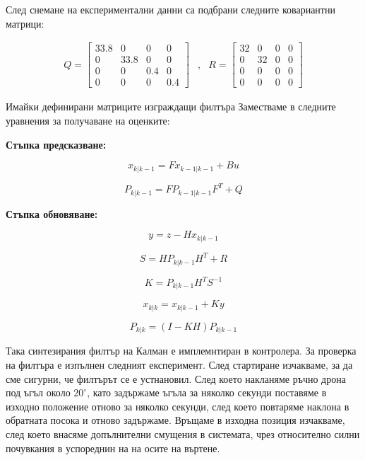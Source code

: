 След снемане на експериментални данни са подбрани следните
ковариантни матрици:

\begin{align}
    Q =
    \begin{bmatrix}
        33.8 & 0 & 0 & 0 \\
        0 & 33.8 & 0 & 0 \\
        0 & 0 & 0.4 & 0 \\
        0 & 0 & 0 & 0.4
    \end{bmatrix} &,&
    R = \begin{bmatrix}
        32 & 0 & 0 & 0 \\
        0 & 32 & 0 & 0 \\
        0 & 0 & 0 & 0 \\
        0 & 0 & 0 & 0
    \end{bmatrix}
\end{align}

Имайки дефинирани матриците изграждащи филтъра Заместваме в следните уравнения за получаване на оценките:

\textbf{Стъпка предсказване:}

\begin{equation}
    x_{k|k-1} = F x_{k-1|k-1} + B u
\end{equation}

\begin{equation}
    P_{k|k-1} = F P_{k-1|k-1} F^T + Q
\end{equation}

\textbf{Стъпка обновяване:}

\begin{equation}
    y = z - H x_{k|k-1}
\end{equation}

\begin{equation}
    S = H P_{k|k-1} H^T + R
\end{equation}

\begin{equation}
    K = P_{k|k-1}H^T S^{-1}
\end{equation}

\begin{equation}
    x_{k|k} = x_{k|k-1} + K y
\end{equation}

\begin{equation}
    P_{k|k} = (I-KH)P_{k|k-1}
\end{equation}


Така синтезирания филтър на Калман е имплемнтиран в контролера.
За проверка на филтъра е изпълнен следният експеримент.
След стартиране изчакваме, за да сме сигурни, че филтърът се е устнановил.
След което накланяме ръчно дрона под ъгъл около \(20^{\circ}\), 
като задържаме ъгъла за няколко секунди поставяме в 
изходно положение отново за няколко секунди,
след което повтаряме наклона в обратната посока и отново задържаме.
Връщаме в изходна позиция изчакваме, след което внасяме допълнителни смущения в системата,
чрез относително силни почувкания в успореднин на на осите на въртене.

